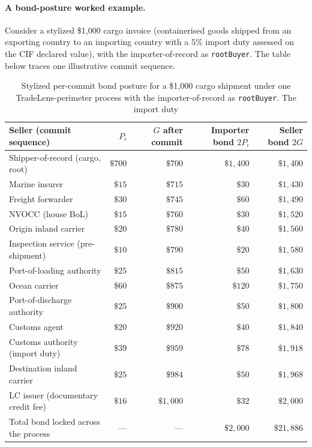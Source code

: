 \documentclass[11pt,a4paper]{article}
\theoremstyle{definition}
\theoremstyle{remark}
\begin{document}
\paragraph{A bond-posture worked example.}
Consider a stylized \$1{,}000 cargo invoice (containerised goods
shipped from an exporting country to an importing country with a
$5\%$ import duty assessed on the CIF declared value), with the
importer-of-record as \texttt{rootBuyer}. The table below traces
one illustrative commit sequence.

\begin{table}[h]
\centering
\small
\begin{tabular}{lrrrr}
\toprule
Seller (commit sequence) & $P_i$ & $G$ after commit & Importer bond $2P_i$ & Seller bond $2G$ \\
\midrule
Shipper-of-record (cargo, root) & $\$700$ & $\$700$ & $\$1{,}400$ & $\$1{,}400$ \\
Marine insurer & $\$15$ & $\$715$ & $\$30$ & $\$1{,}430$ \\
Freight forwarder & $\$30$ & $\$745$ & $\$60$ & $\$1{,}490$ \\
NVOCC (house BoL) & $\$15$ & $\$760$ & $\$30$ & $\$1{,}520$ \\
Origin inland carrier & $\$20$ & $\$780$ & $\$40$ & $\$1{,}560$ \\
Inspection service (pre-shipment) & $\$10$ & $\$790$ & $\$20$ & $\$1{,}580$ \\
Port-of-loading authority & $\$25$ & $\$815$ & $\$50$ & $\$1{,}630$ \\
Ocean carrier & $\$60$ & $\$875$ & $\$120$ & $\$1{,}750$ \\
Port-of-discharge authority & $\$25$ & $\$900$ & $\$50$ & $\$1{,}800$ \\
Customs agent & $\$20$ & $\$920$ & $\$40$ & $\$1{,}840$ \\
Customs authority (import duty) & $\$39$ & $\$959$ & $\$78$ & $\$1{,}918$ \\
Destination inland carrier & $\$25$ & $\$984$ & $\$50$ & $\$1{,}968$ \\
LC issuer (documentary credit fee) & $\$16$ & $\$1{,}000$ & $\$32$ & $\$2{,}000$ \\
\midrule
Total bond locked across the process & --- & --- & $\$2{,}000$ & $\$21{,}886$ \\
\bottomrule
\end{tabular}
\caption{Stylized per-commit bond posture for a \$1{,}000 cargo
shipment under one TradeLens-perimeter process with the
importer-of-record as \texttt{rootBuyer}. The import duty
}
\end{table}
\end{document}
